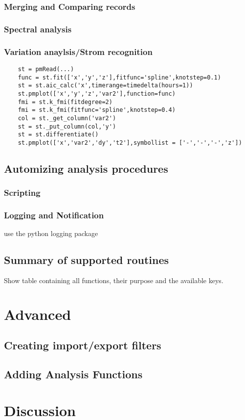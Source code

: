 \subsubsection{Merging and Comparing records}

\subsubsection{Spectral analysis}

\subsubsection{Variation anaylsis/Strom recognition}

\begin{verbatim}
    st = pmRead(...)
    func = st.fit(['x','y','z'],fitfunc='spline',knotstep=0.1)
    st = st.aic_calc('x',timerange=timedelta(hours=1))
    st.pmplot(['x','y','z','var2'],function=func)
    fmi = st.k_fmi(fitdegree=2)
    fmi = st.k_fmi(fitfunc='spline',knotstep=0.4)
    col = st._get_column('var2')
    st = st._put_column(col,'y')
    st = st.differentiate()
    st.pmplot(['x','var2','dy','t2'],symbollist = ['-','-','-','z'])
\end{verbatim}


\subsection{Automizing analysis procedures}

\subsubsection{Scripting}

\subsubsection{Logging and Notification}

use the python logging package

\subsection{Summary of supported routines}

Show table containing all functions, their purpose and the available keys.

\section{Advanced}

\subsection{Creating import/export filters}

\subsection{Adding Analysis Functions}

\section{Discussion}

